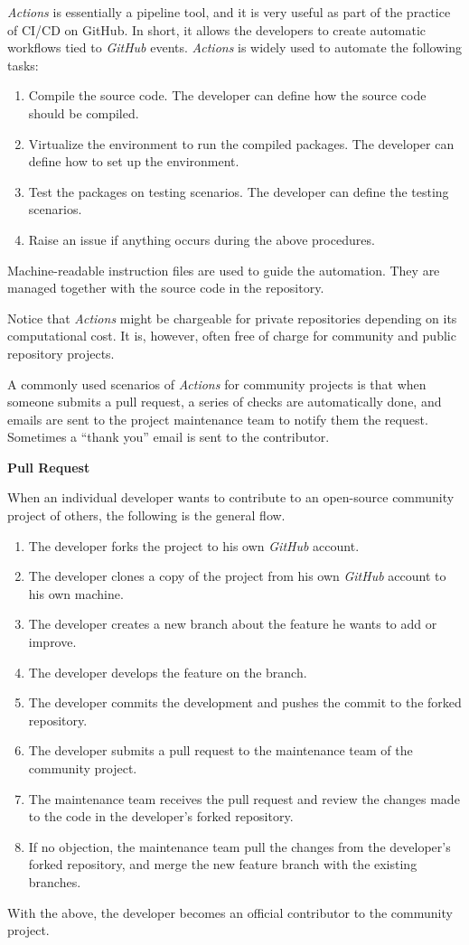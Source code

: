 \textit{Actions} is essentially a pipeline tool, and it is very useful as part of the practice of CI/CD on GitHub. In short, it allows the developers to create automatic workflows tied to \textit{GitHub} events. \textit{Actions} is widely used to automate the following tasks:
\begin{enumerate}
  \item Compile the source code. The developer can define how the source code should be compiled.
  \item Virtualize the environment to run the compiled packages. The developer can define how to set up the environment.
  \item Test the packages on testing scenarios. The developer can define the testing scenarios.
  \item Raise an issue if anything occurs during the above procedures.
\end{enumerate}
Machine-readable instruction files are used to guide the automation. They are managed together with the source code in the repository.

Notice that \textit{Actions} might be chargeable for private repositories depending on its computational cost. It is, however, often free of charge for community and public repository projects.

A commonly used scenarios of \textit{Actions} for community projects is that when someone submits a pull request, a series of checks are automatically done, and emails are sent to the project maintenance team to notify them the request. Sometimes a ``thank you'' email is sent to the contributor.

\begin{mdframed}
	\centerline{\textbf{Pull Request}}
	
	When an individual developer wants to contribute to an open-source community project of others, the following is the general flow.
	\begin{enumerate}
		\item The developer forks the project to his own \textit{GitHub} account.
		\item The developer clones a copy of the project from his own \textit{GitHub} account to his own machine.
		\item The developer creates a new branch about the feature he wants to add or improve.
		\item The developer develops the feature on the branch.
		\item The developer commits the development and pushes the commit to the forked repository.
		\item The developer submits a pull request to the maintenance team of the community project.
		\item The maintenance team receives the pull request and review the changes made to the code in the developer's forked repository.
		\item If no objection, the maintenance team pull the changes from the developer's forked repository, and merge the new feature branch with the existing branches.
	\end{enumerate}
	With the above, the developer becomes an official contributor to the community project.
\end{mdframed}

